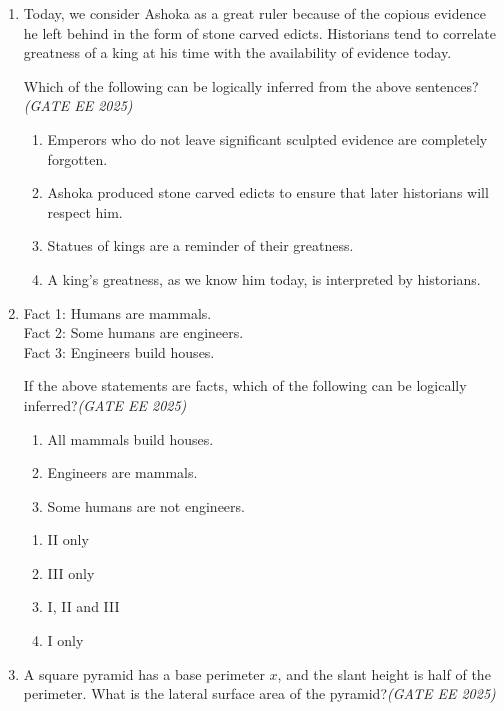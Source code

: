\documentclass[11pt,a4paper]{article}
\begin{document}
\begin{enumerate}[leftmargin=*,label=\textbf{Q.\arabic*},resume]
\item Today, we consider Ashoka as a great ruler because of the copious evidence he left behind in the form of stone carved edicts. Historians tend to correlate greatness of a king at his time with the availability of evidence today.

Which of the following can be logically inferred from the above sentences?\hfill \textit{(GATE EE 2025)}
\begin{enumerate}[label=(\Alph*)]
\item Emperors who do not leave significant sculpted evidence are completely forgotten.
\item Ashoka produced stone carved edicts to ensure that later historians will respect him.
\item Statues of kings are a reminder of their greatness.
\item A king’s greatness, as we know him today, is interpreted by historians.
\end{enumerate}

\item Fact 1: Humans are mammals.\\ 
Fact 2: Some humans are engineers.\\ 
Fact 3: Engineers build houses.

If the above statements are facts, which of the following can be logically inferred?\hfill \textit{(GATE EE 2025)}

\begin{enumerate}[label=\roman*.]
\item All mammals build houses.
\item Engineers are mammals.
\item Some humans are not engineers.
\end{enumerate}

\begin{multicols}{2}
\begin{enumerate}[label=(\Alph*)]
\item II only
\item III only
\item I, II and III
\item I only
\end{enumerate}
\end{multicols}

\item A square pyramid has a base perimeter $x$, and the slant height is half of the perimeter. What is the lateral surface area of the pyramid?\hfill \textit{(GATE EE 2025)}


\end{enumerate}
\end{document}
